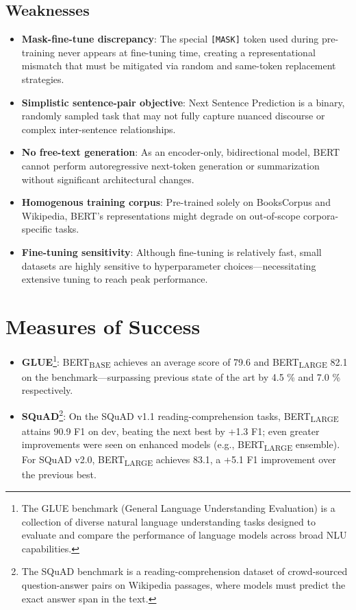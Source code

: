 \documentclass[10pt]{article}
\begin{document}
\subsection*{Weaknesses}

\begin{itemize}
    \item \textbf{Mask-fine-tune discrepancy}: The special \texttt{[MASK]} token used during pre-training never appears at fine-tuning time, creating a representational mismatch that must be mitigated via random and same-token replacement strategies.
    \item \textbf{Simplistic sentence-pair objective}: Next Sentence Prediction is a binary, randomly sampled task that may not fully capture nuanced discourse or complex inter-sentence relationships.
    \item \textbf{No free-text generation}: As an encoder-only, bidirectional model, BERT cannot perform autoregressive next-token generation or summarization without significant architectural changes.
    \item \textbf{Homogenous training corpus}: Pre-trained solely on BooksCorpus and Wikipedia, BERT's representations might degrade on out-of-scope corpora-specific tasks.
    \item \textbf{Fine-tuning sensitivity}: Although fine-tuning is relatively fast, small datasets are highly sensitive to hyperparameter choices—necessitating extensive tuning to reach peak performance.
\end{itemize}

\section*{Measures of Success}
\begin{itemize}
    \item \textbf{GLUE}\footnote{The GLUE benchmark (General Language Understanding Evaluation) is a collection of diverse natural language understanding tasks designed to evaluate and compare the performance of language models across broad NLU capabilities.}: BERT\textsubscript{BASE} achieves an average score of 79.6 and BERT\textsubscript{LARGE} 82.1 on the  benchmark—surpassing previous state of the art by 4.5 \% and 7.0 \% respectively.
    \item \textbf{SQuAD}\footnote{The SQuAD benchmark is a reading-comprehension dataset of crowd-sourced question-answer pairs on Wikipedia passages, where models must predict the exact answer span in the text.}: On the SQuAD v1.1 reading-comprehension tasks, BERT\textsubscript{LARGE} attains 90.9 F1 on dev, beating the next best by +1.3 F1; even greater improvements were seen on enhanced models (e.g., BERT\textsubscript{LARGE} ensemble). For SQuAD v2.0, BERT\textsubscript{LARGE} achieves 83.1, a +5.1 F1 improvement over the previous best.
\end{itemize}
\end{document}
